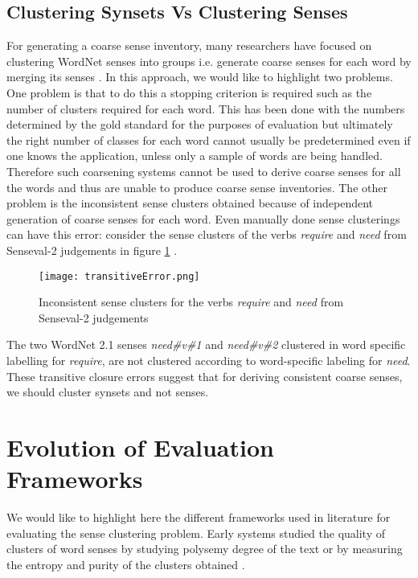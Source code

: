 \subsection{Clustering Synsets Vs Clustering Senses}
For generating a coarse sense inventory, many researchers have focused on clustering WordNet senses into groups i.e. generate coarse senses for each word by merging its senses \citep{agirre2003clustering} \citep{chklovski2003exploiting} \citep{Navigli06meaningfulclustering}. In this approach, we would like to highlight two problems. One problem is that to do this a stopping criterion is required such as the number of clusters required for each word. This has been done with the numbers determined by the gold standard for the purposes of evaluation \citep{agirre2003clustering} but ultimately the right number of classes for each word cannot usually be predetermined even if one knows the application, unless only a sample of words are being handled. Therefore such coarsening systems cannot be used to derive coarse senses for all the words and thus are unable to produce coarse sense inventories. The other problem is the inconsistent sense clusters obtained because of independent generation of coarse senses for each word. Even manually done sense clusterings can have this error: consider the sense clusters of the verbs \textit{require} and \textit{need} from Senseval-2 judgements in figure \ref{fig:transitiveError} \citep{snow07mergesense}.

\begin{figure}[h]
\begin{center}
\texttt{[image: transitiveError.png]}
\caption{Inconsistent sense clusters for the verbs \textit{require} and \textit{need} from Senseval-2 judgements}
\label{fig:transitiveError}
\end{center}
\end{figure}

The two WordNet 2.1 senses \textit{need\#v\#1} and \textit{need\#v\#2} clustered in word specific labelling for \textit{require}, are not clustered according to word-specific labeling for \textit{need}. These transitive closure errors suggest that for deriving consistent coarse senses, we should cluster synsets and not senses.

\section{Evolution of Evaluation Frameworks}
We would like to highlight here the different frameworks used in literature for evaluating the sense clustering problem. Early systems studied the quality of clusters of word senses by studying polysemy degree of the text \citep{Mihalcea01ez.wordnet:principles} or by measuring the entropy and purity of the clusters obtained \citep{agirre2003clustering}.

